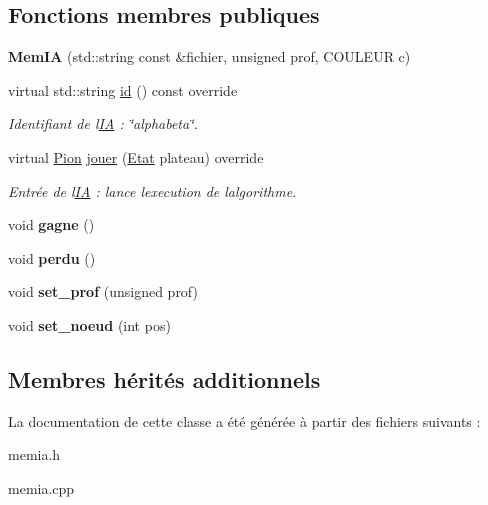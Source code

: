 \subsection*{Fonctions membres publiques}
\begin{DoxyCompactItemize}
\item 
{\bfseries Mem\+IA} (std\+::string const \&fichier, unsigned prof, C\+O\+U\+L\+E\+UR c)\hypertarget{classMemIA_a2c0eed85d2e17e428b62fb4ba23cde1c}{}\label{classMemIA_a2c0eed85d2e17e428b62fb4ba23cde1c}

\item 
virtual std\+::string \hyperlink{classMemIA_a1075fe7a51c71bca7fd6b3cd63d3271d}{id} () const override\hypertarget{classMemIA_a1075fe7a51c71bca7fd6b3cd63d3271d}{}\label{classMemIA_a1075fe7a51c71bca7fd6b3cd63d3271d}

\begin{DoxyCompactList}\small\item\em Identifiant de l\textquotesingle{}\hyperlink{classIA}{IA} \+: \char`\"{}alphabeta\char`\"{}. \end{DoxyCompactList}\item 
virtual \hyperlink{structPion}{Pion} \hyperlink{classMemIA_a82b883399e9d663c382994190572c0a6}{jouer} (\hyperlink{structEtat}{Etat} plateau) override\hypertarget{classMemIA_a82b883399e9d663c382994190572c0a6}{}\label{classMemIA_a82b883399e9d663c382994190572c0a6}

\begin{DoxyCompactList}\small\item\em Entrée de l\textquotesingle{}\hyperlink{classIA}{IA} \+: lance l\textquotesingle{}execution de l\textquotesingle{}algorithme. \end{DoxyCompactList}\item 
void {\bfseries gagne} ()\hypertarget{classMemIA_a5c2b4334f3830d2659d4b25d174aa563}{}\label{classMemIA_a5c2b4334f3830d2659d4b25d174aa563}

\item 
void {\bfseries perdu} ()\hypertarget{classMemIA_a1aba65e04d27d75f0dee1f53d9f20025}{}\label{classMemIA_a1aba65e04d27d75f0dee1f53d9f20025}

\item 
void {\bfseries set\+\_\+prof} (unsigned prof)\hypertarget{classMemIA_a533276bc61af601452e9b1c29953371d}{}\label{classMemIA_a533276bc61af601452e9b1c29953371d}

\item 
void {\bfseries set\+\_\+noeud} (int pos)\hypertarget{classMemIA_a4efede59191924b76042bbc45860efc6}{}\label{classMemIA_a4efede59191924b76042bbc45860efc6}

\end{DoxyCompactItemize}
\subsection*{Membres hérités additionnels}


La documentation de cette classe a été générée à partir des fichiers suivants \+:\begin{DoxyCompactItemize}
\item 
memia.\+h\item 
memia.\+cpp\end{DoxyCompactItemize}
